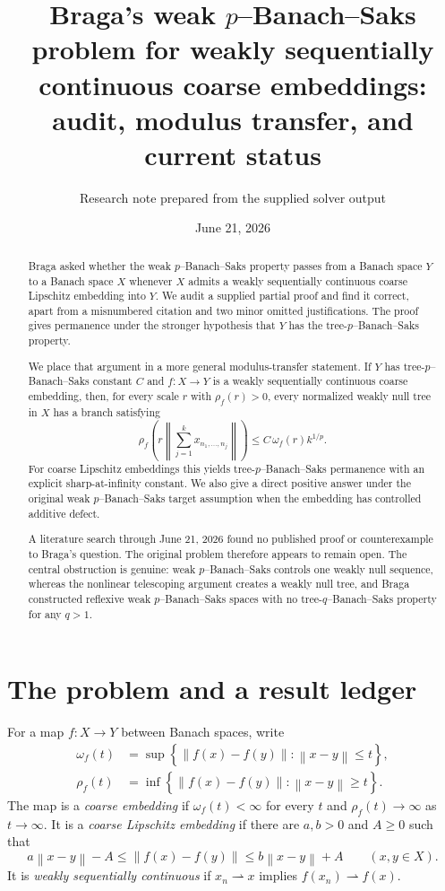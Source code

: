 \documentclass[11pt]{amsart}
\title[Braga's weak $p$--Banach--Saks problem]{Braga's weak $p$--Banach--Saks problem for weakly sequentially continuous coarse embeddings:\\audit, modulus transfer, and current status}
\author{Research note prepared from the supplied solver output}
\date{June 21, 2026}
\theoremstyle{definition}
\theoremstyle{remark}
\newcommand{\norm}[1]{\left\lVert #1\right\rVert}
\newcommand{\set}[1]{\left\{#1\right\}}
\begin{document}
\begin{abstract}
Braga asked whether the weak $p$--Banach--Saks property passes from a Banach space $Y$ to a Banach space $X$ whenever $X$ admits a weakly sequentially continuous coarse Lipschitz embedding into $Y$.  We audit a supplied partial proof and find it correct, apart from a misnumbered citation and two minor omitted justifications.  The proof gives permanence under the stronger hypothesis that $Y$ has the tree-$p$--Banach--Saks property.

We place that argument in a more general modulus-transfer statement.  If $Y$ has tree-$p$--Banach--Saks constant $C$ and $f:X\to Y$ is a weakly sequentially continuous coarse embedding, then, for every scale $r$ with $\rho_f(r)>0$, every normalized weakly null tree in $X$ has a branch satisfying
\[
 \rho_f\!\left(r\norm{\sum_{j=1}^k x_{n_1,\ldots,n_j}}\right)
 \le C\,\omega_f(r)k^{1/p}.
\]
For coarse Lipschitz embeddings this yields tree-$p$--Banach--Saks permanence with an explicit sharp-at-infinity constant.  We also give a direct positive answer under the original weak $p$--Banach--Saks target assumption when the embedding has controlled additive defect.

A literature search through June 21, 2026 found no published proof or counterexample to Braga's question.  The original problem therefore appears to remain open.  The central obstruction is genuine: weak $p$--Banach--Saks controls one weakly null sequence, whereas the nonlinear telescoping argument creates a weakly null tree, and Braga constructed reflexive weak $p$--Banach--Saks spaces with no tree-$q$--Banach--Saks property for any $q>1$.
\end{abstract}
\maketitle

\section{The problem and a result ledger}

For a map $f:X\to Y$ between Banach spaces, write
\begin{align*}
 \omega_f(t)&=\sup\set{\norm{f(x)-f(y)}: \norm{x-y}\le t},\\
 \rho_f(t)&=\inf\set{\norm{f(x)-f(y)}: \norm{x-y}\ge t}.
\end{align*}
The map is a \emph{coarse embedding} if $\omega_f(t)<\infty$ for every $t$ and $\rho_f(t)\to\infty$ as $t\to\infty$.  It is a \emph{coarse Lipschitz embedding} if there are $a,b>0$ and $A\ge0$ such that
\begin{equation}\label{eq:affine-control}
 a\norm{x-y}-A\le \norm{f(x)-f(y)}\le b\norm{x-y}+A
 \qquad(x,y\in X).
\end{equation}
It is \emph{weakly sequentially continuous} if $x_n\rightharpoonup x$ implies $f(x_n)\rightharpoonup f(x)$.
\end{document}
